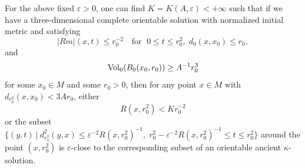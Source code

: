 \begin{lemma}
  \label{lem:cz-local-ancient-model-alternative}
For the above fixed $\varepsilon>0$, one can find
$K=K(A,\varepsilon)<+\infty$ such that if we have a
three-dimensional complete orientable solution with normalized
initial metric and satisfying
$$
|Rm|(x,t)\le r_0^{-2}\quad \mbox{for }\; 0\le t\le
r_0^2,\;d_0(x,x_0)\le r_0,
$$
and
$$
\operatorname{Vol}_0(B_0(x_0,r_0))\ge A^{-1}r_0^3
$$
for some $x_0 \in M$ and some $r_0 > 0$, then for any point $x\in
M$ with $d_{r_0^2}(x,x_0)<3Ar_0$, either $$R(x,r_0^2)< Kr_0^{-2}$$
or the subset $\{(y,t)\ |\ d_{r_0^2}^2(y,x)\leq \varepsilon^{-2}
R(x,r_0^2)^{-1},\;r_0^2-\varepsilon^{-2} R(x,r_0^2)^{-1}\le t\le
r_0^2\}$ around the point $(x,r_0^2)$ is $\varepsilon$-close to
the corresponding subset of an orientable ancient
$\kappa$-solution.
\medskip

\end{lemma}
